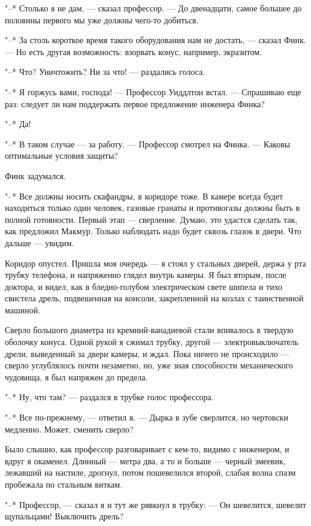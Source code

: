 "--* Столько я не дам, --- сказал профессор. --- До двенадцати, самое  большее
до половины первого мы уже должны чего-то добиться.

"--* За столь короткое время такого оборудования нам не достать, ---  сказал
Финк. --- Но есть другая возможность: взорвать конус, например, экразитом.

"--* Что? Уничтожить? Ни за что! --- раздались голоса.

"--* Я горжусь вами, господа! --- Профессор Уиддлтон встал. --- Спрашиваю  еще
раз: следует ли нам поддержать первое предложение инженера Финка?

"--* Да!

"--* В таком случае --- за работу. --- Профессор смотрел на  Финка.  ---  Каковы
оптимальные условия защиты?

Финк задумался.

"--* Все должны носить скафандры, в коридоре тоже. В камере  всегда  будет
находиться только один человек, газовые гранаты и противогазы должны  быть
в полной готовности. Первый этап --- сверление. Думаю, это  удастся  сделать
так, как предложил Макмур. Только наблюдать надо  будет  сквозь  глазок  в
двери. Что дальше --- увидим.

Коридор опустел. Пришла моя очередь --- я стоял у стальных дверей,  держа
у рта трубку телефона, и напряженно глядел внутрь камеры.  Я  был  вторым,
после доктора, и видел, как в бледно-голубом электрическом свете шипела  и
тихо свистела дрель, подвешенная на  консоли,  закрепленной  на  козлах  с
таинственной машиной.

Сверло  большого  диаметра  из  кремний-ванадиевой  стали  впивалось  в
твердую  оболочку  конуса.  Одной  рукой  я  сжимал   трубку,   другой   ---
электровыключатель дрели, выведенный за двери камеры, и ждал. Пока  ничего
не  происходило  ---  сверло  углублялось  почти  незаметно,  но,  уже  зная
способности механического чудовища, я был напряжен до предела.

"--* Ну, что там? --- раздался в трубке голос профессора.

"--* Все по-прежнему, --- ответил я. --- Дырка в зубе сверлится, но  чертовски
медленно. Может, сменить сверло?

Было слышно, как профессор разговаривает с кем-то, видимо с  инженером,
и вдруг я окаменел. Длинный --- метра два, а то и больше ---  черный  змеевик,
лежавший на настиле, дрогнул, потом пошевелился второй, слабая волна спазм
пробежала по стальным виткам.

"--* Профессор, --- сказал я и тут же рявкнул  в  трубку:  ---  Он  шевелится,
шевелит щупальцами! Выключить дрель?

